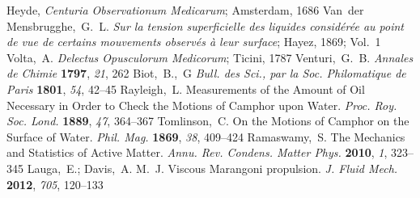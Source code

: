 \documentclass[journal=langd5, manuscript=article, layout=twocolumn]{achemso}
\begin{document}
\begin{mcitethebibliography}{27}
Heyde, \emph{Centuria Observationum Medicarum}; Amsterdam, 1686\relax
\mciteBstWouldAddEndPuncttrue
\mciteSetBstMidEndSepPunct{\mcitedefaultmidpunct}
{\mcitedefaultendpunct}{\mcitedefaultseppunct}\relax
\EndOfBibitem
{}
Van~der Mensbrugghe,~G.~L. \emph{Sur la tension superficielle des liquides
  consid{\'e}r{\'e}e au point de vue de certains mouvements observ{\'e}s {\`a}
  leur surface}; Hayez, 1869; Vol.~1\relax
\mciteBstWouldAddEndPuncttrue
\mciteSetBstMidEndSepPunct{\mcitedefaultmidpunct}
{\mcitedefaultendpunct}{\mcitedefaultseppunct}\relax
\EndOfBibitem
{}
Volta,~A. \emph{Delectus Opusculorum Medicorum}; Ticini, 1787\relax
\mciteBstWouldAddEndPuncttrue
\mciteSetBstMidEndSepPunct{\mcitedefaultmidpunct}
{\mcitedefaultendpunct}{\mcitedefaultseppunct}\relax
\EndOfBibitem
{}
Venturi,~G.~B. \emph{Annales de Chimie} \textbf{1797}, \emph{21}, 262\relax
\mciteBstWouldAddEndPuncttrue
\mciteSetBstMidEndSepPunct{\mcitedefaultmidpunct}
{\mcitedefaultendpunct}{\mcitedefaultseppunct}\relax
\EndOfBibitem
{}
Biot,~B.,~G \emph{Bull. des Sci., par la Soc. Philomatique de Paris}
  \textbf{1801}, \emph{54}, 42--45\relax
\mciteBstWouldAddEndPuncttrue
\mciteSetBstMidEndSepPunct{\mcitedefaultmidpunct}
{\mcitedefaultendpunct}{\mcitedefaultseppunct}\relax
\EndOfBibitem
{}
Rayleigh,~L. Measurements of the Amount of Oil Necessary in Order to Check the
  Motions of Camphor upon Water. \emph{Proc. Roy. Soc. Lond.} \textbf{1889},
  \emph{47}, 364--367\relax
\mciteBstWouldAddEndPuncttrue
\mciteSetBstMidEndSepPunct{\mcitedefaultmidpunct}
{\mcitedefaultendpunct}{\mcitedefaultseppunct}\relax
\EndOfBibitem
{}
Tomlinson,~C. On the Motions of Camphor on the Surface of Water. \emph{Phil.
  Mag.} \textbf{1869}, \emph{38}, 409--424\relax
\mciteBstWouldAddEndPuncttrue
\mciteSetBstMidEndSepPunct{\mcitedefaultmidpunct}
{\mcitedefaultendpunct}{\mcitedefaultseppunct}\relax
\EndOfBibitem
{}
Ramaswamy,~S. The Mechanics and Statistics of Active Matter. \emph{Annu. Rev.
  Condens. Matter Phys.} \textbf{2010}, \emph{1}, 323--345\relax
\mciteBstWouldAddEndPuncttrue
\mciteSetBstMidEndSepPunct{\mcitedefaultmidpunct}
{\mcitedefaultendpunct}{\mcitedefaultseppunct}\relax
\EndOfBibitem
{}
Lauga,~E.; Davis,~A. M.~J. Viscous Marangoni propulsion. \emph{J. Fluid Mech.}
  \textbf{2012}, \emph{705}, 120--133\relax

\end{mcitethebibliography}
\end{document}
